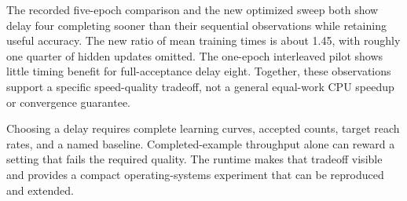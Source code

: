 \documentclass[conference]{IEEEtran}
\begin{document}
The recorded five-epoch comparison and the new optimized sweep both show delay four completing sooner than their sequential observations while retaining useful accuracy. The new ratio of mean training times is about 1.45, with roughly one quarter of hidden updates omitted. The one-epoch interleaved pilot shows little timing benefit for full-acceptance delay eight. Together, these observations support a specific speed-quality tradeoff, not a general equal-work CPU speedup or convergence guarantee.

Choosing a delay requires complete learning curves, accepted counts, target reach rates, and a named baseline. Completed-example throughput alone can reward a setting that fails the required quality. The runtime makes that tradeoff visible and provides a compact operating-systems experiment that can be reproduced and extended.



\end{document}
